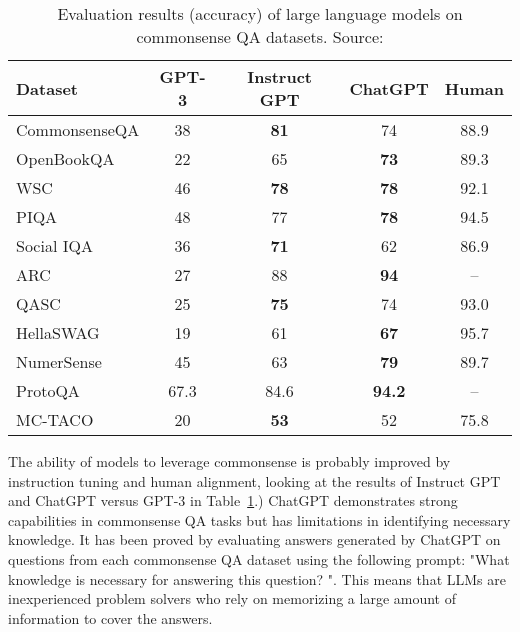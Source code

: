\begin{table}[h!]
	\centering
	\small
	\begin{tabular}{|l|c|c|c|c|}
		\hline
		Dataset       & GPT-3 & Instruct GPT & ChatGPT       & Human \\
		\hline
		CommonsenseQA & 38    & \textbf{81}  & 74            & 88.9  \\
		OpenBookQA    & 22    & 65           & \textbf{73}   & 89.3  \\
		WSC           & 46    & \textbf{78}  & \textbf{78}   & 92.1  \\
		PIQA          & 48    & 77           & \textbf{78}   & 94.5  \\
		Social IQA    & 36    & \textbf{71}  & 62            & 86.9  \\
		ARC           & 27    & 88           & \textbf{94}   & --    \\
		QASC          & 25    & \textbf{75}  & 74            & 93.0  \\
		HellaSWAG     & 19    & 61           & \textbf{67}   & 95.7  \\
		NumerSense    & 45    & 63           & \textbf{79}   & 89.7  \\
		ProtoQA       & 67.3  & 84.6         & \textbf{94.2} & --    \\
		MC-TACO       & 20    & \textbf{53}  & 52            & 75.8  \\
		\hline
	\end{tabular}
	\caption{Evaluation results (accuracy) of large language models on commonsense QA datasets. Source: \textcite{bian2024chatgpt}}
	\label{tab:commonsense-results}
\end{table}
The ability of models to leverage commonsense is probably improved by instruction tuning and human alignment, looking at the results of Instruct GPT and ChatGPT versus GPT-3 in Table~\ref{tab:commonsense-results}.)
ChatGPT demonstrates strong capabilities in commonsense QA tasks but has limitations in identifying necessary knowledge.
It has been proved by evaluating answers generated by ChatGPT on questions from each commonsense QA dataset using the following prompt: "What knowledge is necessary for answering this question? ".
This means that LLMs are inexperienced problem solvers who rely on memorizing a large amount of information to cover the answers\cite{bian2024chatgpt}.

